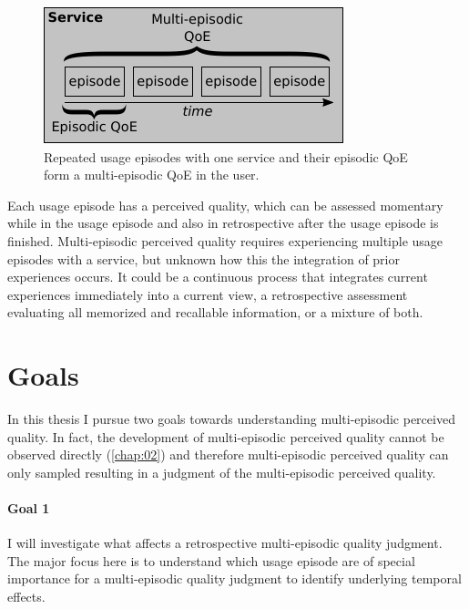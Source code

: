 \begin{figure}
	\centering
	\includegraphics[width=1\columnwidth]{figure/multi-episodic}
	\caption{Repeated usage episodes with one service and their episodic QoE form a multi-episodic QoE in the user.}
	\label{img:chap01:multi-episodic}
\end{figure}

Each usage episode has a perceived quality, which can be assessed momentary while in the usage episode and also in retrospective after the usage episode is finished.
Multi-episodic perceived quality requires experiencing multiple usage episodes with a service, but unknown how this the integration of prior experiences occurs.
It could be a continuous process that integrates current experiences immediately into a current view, a retrospective assessment evaluating all memorized and recallable information, or a mixture of both. %

\section{Goals}
In this thesis I pursue two goals towards understanding multi-episodic perceived quality.
In fact, the development of multi-episodic perceived quality cannot be observed directly (\cf \autoref{chap:02}) and therefore multi-episodic perceived quality can only sampled resulting in a judgment of the multi-episodic perceived quality.

\paragraph*{Goal 1}
I will investigate what affects a retrospective multi-episodic quality judgment.
The major focus here is to understand which usage episode are of special importance for a multi-episodic quality judgment to identify underlying temporal effects.


